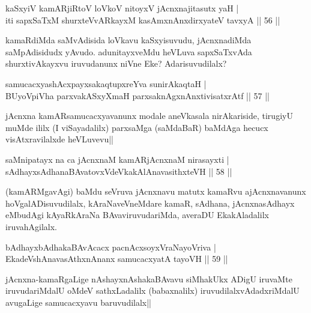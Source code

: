 
\begin{shl}
kaSxyiV kamARjiRtoV loVkoV nitoyxV jAcnxnajitasutx yaH |\\
iti sapxSaTxM shurxteVvARkayxM kasAmxnAnx\s \s dirxyateV tavxyA \hfill || 56 ||
\end{shl}

\begin{artha}
kamaRdiMda saMvAdisida loVkavu kaSxyisuvudu, jAcnxnadiMda saMpAdisidudx yAvudo. 
adunitayxveMdu heVLuva sapxSaTxvAda shurxtivAkayxvu iruvudanunx niVne Eke? Adarisuvudilalx?
\end{artha}

\begin{shl}
samucacxyashAcxpayxsakaqtupxreYva sunirAkaqtaH |\\
BUyoV\s piVha parxvakASxyXmaH parxsaknAgxnAnxtivisatxrAtf \hfill || 57 ||
\end{shl}

\begin{artha}
jAcnxna kamARsamucacxyavanunx  modale aneVkasala nirAkariside, tirugiyU muMde ililx (I viSayadalilx) parxsaMga (saMdaBaR) baMdAga hecucx visAtxravilalxde heVLuvevu||
\end{artha}


\begin{shl}
saMnipatayx na ca jAcnxnaM kamARjAcnxnaM nirasayxti |\\
sAdhayxsAdhanaBAvatovxVdeVkakAlAnavasithxteVH \hfill || 58 ||
\end{shl}

\begin{artha} 
(kamARMgavAgi) baMdu seVruva jAcnxnavu matutx kamaRvu ajAcnxnavanunx hoVgalADisuvudilalx, kAraNaveVneMdare kamaR, sAdhana, jAcnxnasAdhayx eMbudAgi kAyaRkAraNa BAvaviruvudariMda, averaDU EkakAladalilx iruvahAgilalx.
\end{artha}


\begin{shl}
bAdhayxbAdhakaBAvAcacx pacnAcxsoyxVraNayoVriva |\\
EkadeVshAnavasAthxnAnanx samucacxyatA tayoVH \hfill || 59 ||
\end{shl}

\begin{artha}
jAcnxna-kamaRgaLige nAshayxnAshakaBAvavu siMhakUkx ADigU iruvaMte iruvudariMdalU oMdeV sathxLadalilx (babaxnalilx) iruvudilalxvAdadxriMdalU avugaLige samucacxyavu baruvudilalx||
\end{artha}

